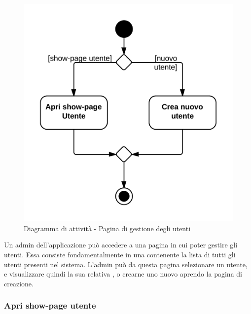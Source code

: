 \begin{figure}[H]
\centering
\includegraphics[scale=0.1]{uml/attivita/MaaP - Apri pagina gestione utenti.png}
\caption{Diagramma di attività - Pagina di gestione degli utenti}
\end{figure}

Un admin dell'applicazione può accedere a una pagina in cui poter gestire gli utenti. Essa consiste fondamentalmente in una  contenente la lista di tutti gli utenti presenti nel sistema. L'admin può da questa pagina selezionare un utente, e visualizzare quindi la sua relativa , o crearne uno nuovo aprendo la pagina di creazione.

\subsubsection{Apri show-page utente}

